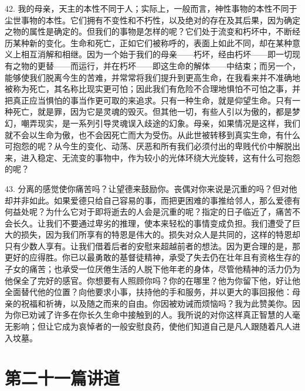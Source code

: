 42. 我的母亲，天主的本性不同于人；实际上，一般而言，神性事物的本性不同于尘世事物的本性。它们拥有不变性和不朽性，以及绝对的存在及其后果，因为确定之物的属性是确定的。但我们的事物是怎样的呢？它们处于流变和朽坏中，不断经历某种新的变化。生命和死亡，正如它们被称呼的，表面上如此不同，却在某种意义上相互消解和相继。因为一个始于我们的母亲——朽坏，经由朽坏——即一切现有之物的更替——而运行，并在朽坏——即这生命的解体——中结束；而另一个，能够使我们脱离今生的苦难，并常常将我们提升到更高生命，在我看来并不准确地被称为死亡，其名称比现实更可怕；因此我们有危险不合理地惧怕不可怕之事，并把真正应当惧怕的事当作更可取的来追求。只有一种生命，就是仰望生命。只有一种死亡，就是罪，因为它是灵魂的毁灭。但其他一切，有些人引以为傲的，都是梦幻，嘲弄现实，是一系列引导灵魂误入歧途的幻象。母亲，如果情况是这样，我们就不会以生命为傲，也不会因死亡而大为受伤。从此世被转移到真实生命，有什么可抱怨的呢？从今生的变化、动荡、厌恶和所有我们必须付出的卑贱代价中解脱出来，进入稳定、无流变的事物中，作为较小的光体环绕大光旋转，这有什么可抱怨的呢？\par

43. 分离的感觉使你痛苦吗？让望德来鼓励你。丧偶对你来说是沉重的吗？但对他却并非如此。如果爱德只给自己容易的事，而把更困难的事推给邻人，那么爱德有何益处呢？为什么它对于即将逝去的人会是沉重的呢？指定的日子临近了，痛苦不会长久。让我们不要通过卑劣的推理，使本来轻松的事情变成负担。我们遭受了巨大的损失，因为我们所享有的特恩是伟大的。损失对众人是共同的，这样的特恩却只有少数人享有。让我们借着后者的安慰来超越前者的想法。因为更合理的是，那更好的应得胜。你已以最勇敢的基督徒精神，承受了失去仍在壮年且有资格生存的子女的痛苦；也承受一位厌倦生活的人脱下他年老的身体，尽管他精神的活力仍为他保全了完好的感官。你想要有人照顾你吗？你的在哪里？他为你留下他，好让他全面替代他的位置？向他要求小事，扶持他的手和服务，并以更大的事回报他：母亲的祝福和祈祷，以及随之而来的自由。你因被劝诫而烦恼吗？我为此赞美你。因为你已劝诫了许多在你长久生命中接触到的人。我所说的对你这样真正智慧的人毫无影响；但让它成为哀悼者的一般安慰良药，使他们知道自己是凡人跟随着凡人进入坟墓。\par



\section{第二十一篇讲道}

